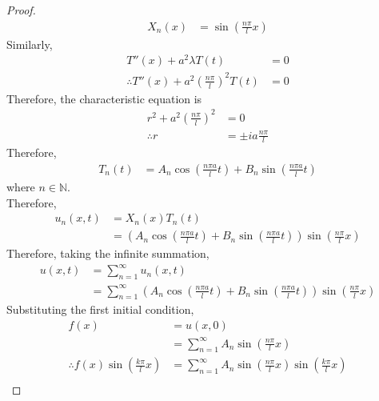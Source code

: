 \documentclass[titlepage, fleqn, a4paper, 12pt, twoside]{article}
\theoremstyle{definition}
\theoremstyle{theorem}
\begin{document}
\begin{proof}
\begin{align*}
		X_n(x) & = \sin\left( \frac{n \pi}{l} x \right)
	\end{align*}
	Similarly,
	\begin{align*}
		T''(x) + a^2 \lambda T(t)                                     & = 0 \\
		\therefore T''(x) + a^2 \left( \frac{n \pi}{l} \right)^2 T(t) & = 0
	\end{align*}
	Therefore, the characteristic equation is
	\begin{align*}
		r^2 + a^2 \left( \frac{n \pi}{l} \right)^2 & = 0 \\
		\therefore r                               & = \pm i a \frac{n \pi}{l}
	\end{align*}
	Therefore,
	\begin{align*}
		T_n(t) & = A_n \cos\left( \frac{n \pi a}{l} t \right) + B_n \sin\left( \frac{n \pi a}{l} t \right)
	\end{align*}
	where $n \in \mathbb{N}$.\\
	Therefore,
	\begin{align*}
		u_n(x,t) & = X_n(x) T_n(t) \\
                         & = \left( A_n \cos\left( \frac{n \pi a}{l} t \right) + B_n \sin\left( \frac{n \pi a}{l} t \right) \right) \sin\left( \frac{n \pi}{l} x \right)
	\end{align*}
	Therefore, taking the infinite summation,
	\begin{align*}
		u(x,t) & = \sum\limits_{n = 1}^{\infty} u_n(x,t) \\
                       & = \sum\limits_{n = 1}^{\infty} \left( A_n \cos\left( \frac{n \pi a}{l} t \right) + B_n \sin\left( \frac{n \pi a}{l} t \right) \right) \sin\left( \frac{n \pi}{l} x \right)
	\end{align*}
	Substituting the first initial condition,
	\begin{align*}
		f(x)                                                                            & = u(x,0)                                                                                                                         \\
                                                                                                & = \sum\limits_{n = 1}^{\infty} A_n \sin\left( \frac{n \pi}{l} x \right)                                                          \\
		\therefore f(x) \sin\left( \frac{k \pi}{l} x \right)                            & = \sum\limits_{n = 1}^{\infty} A_n \sin\left( \frac{n \pi}{l} x \right) \sin\left( \frac{k \pi}{l} x \right)                     \\

\end{align*}
\end{proof}
\end{document}

